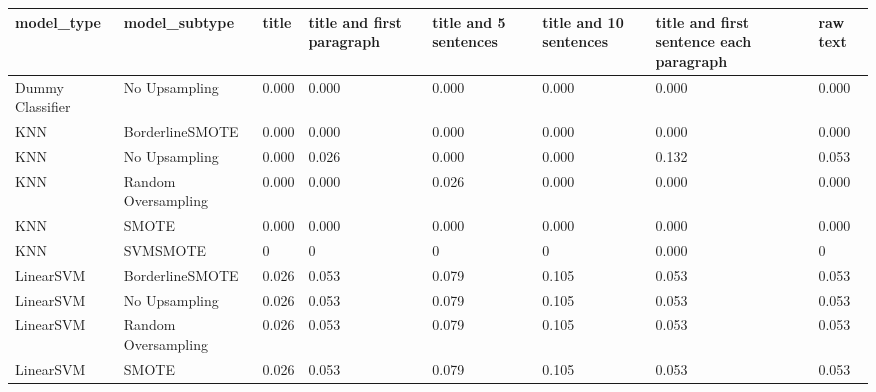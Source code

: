 \begin{tabular}{llllllll}
\toprule
                  model\_type &       model\_subtype & title & title and first paragraph & title and 5 sentences & title and 10 sentences & title and first sentence each paragraph & raw text \\
\midrule
            Dummy Classifier &       No Upsampling & 0.000 &                     0.000 &                 0.000 &                  0.000 &                                   0.000 &    0.000 \\
                         KNN &     BorderlineSMOTE & 0.000 &                     0.000 &                 0.000 &                  0.000 &                                   0.000 &    0.000 \\
                         KNN &       No Upsampling & 0.000 &                     0.026 &                 0.000 &                  0.000 &                                   0.132 &    0.053 \\
                         KNN & Random Oversampling & 0.000 &                     0.000 &                 0.026 &                  0.000 &                                   0.000 &    0.000 \\
                         KNN &               SMOTE & 0.000 &                     0.000 &                 0.000 &                  0.000 &                                   0.000 &    0.000 \\
                         KNN &            SVMSMOTE &     0 &                         0 &                     0 &                      0 &                                   0.000 &        0 \\
                   LinearSVM &     BorderlineSMOTE & 0.026 &                     0.053 &                 0.079 &                  0.105 &                                   0.053 &    0.053 \\
                   LinearSVM &       No Upsampling & 0.026 &                     0.053 &                 0.079 &                  0.105 &                                   0.053 &    0.053 \\
                   LinearSVM & Random Oversampling & 0.026 &                     0.053 &                 0.079 &                  0.105 &                                   0.053 &    0.053 \\
                   LinearSVM &               SMOTE & 0.026 &                     0.053 &                 0.079 &                  0.105 &                                   0.053 &    0.053 \\

\end{tabular}
